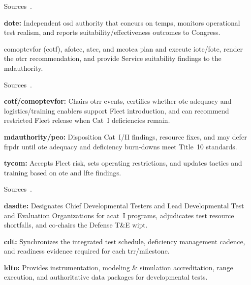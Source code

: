 \documentclass[../main.tex]{subfiles}
\begin{document}
\begin{description}[style=nextline, labelsep=0.5em, font=\bfseries]
  \item[\textbf{Operational test oversight.}]
        Sources~\autocite{DoDI5000-85,DoDI5000-89,DoDI5000-98}.
        \begin{description}
          \item \textbf{\ac{dote}:} Independent \ac{osd} authority that concurs on \ac{temp}s, monitors operational test realism, and reports suitability/effectiveness outcomes to Congress.
          \item[\textbf{Service Operational Test Agencies.}] \ac{comoptevfor} (\acs{cotf}), \ac{afotec}, \ac{atec}, and \ac{mcotea} plan and execute \ac{iote}/\ac{fote}, render the \ac{otrr} recommendation, and provide Service suitability findings to the \ac{mdauthority}.
        \end{description}
  \item[\textbf{Operational test readiness and fleet release.}]
        Sources~\autocite{edo-3-5-6-test-eval-part-ii-2025,DoDI5000-89}.
        \begin{description}
          \item \textbf{\ac{cotf}/\ac{comoptevfor}:} Chairs \ac{otrr} events, certifies whether \ac{ote} adequacy and logistics/training enablers support Fleet introduction, and can recommend restricted Fleet release when Cat~I deficiencies remain.
          \item \textbf{\ac{mdauthority}/\ac{peo}:} Disposition Cat~I/II findings, resource fixes, and may defer \ac{frpdr} until \ac{ote} adequacy and deficiency burn-downs meet Title~10 standards.
          \item \textbf{\ac{tycom}:} Accepts Fleet risk, sets operating restrictions, and updates tactics and training based on \ac{ote} and \ac{lfte} findings.
        \end{description}
  \item[\textbf{Developmental test governance.}]
        Sources~\autocite{DoDI5000-89}.
        \begin{description}
          \item \textbf{\ac{dasdte}:} Designates Chief Developmental Testers and Lead Developmental Test and Evaluation Organizations for \ac{acat}~I programs, adjudicates test resource shortfalls, and co-chairs the Defense T\&E \ac{wipt}.
          \item \textbf{\ac{cdt}:} Synchronizes the integrated test schedule, deficiency management cadence, and readiness evidence required for each \ac{trr}/milestone.
          \item \textbf{\ac{ldto}:} Provides instrumentation, modeling \& simulation accreditation, range execution, and authoritative data packages for developmental tests.

\end{description}
\end{description}
\end{document}
